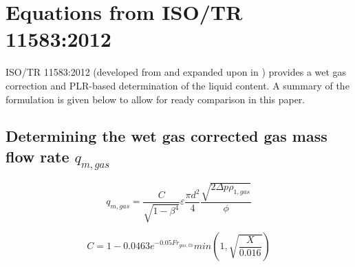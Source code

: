 \documentclass[journal]{IEEEtran}
\begin{document}
\vfill\eject

%
\appendices
\section{Equations from ISO/TR 11583:2012} \label{11583 Equations}

ISO/TR 11583:2012\cite{2012ISO/TRConduits} (developed from \cite{Reader-Harris2009} and expanded upon in \cite{Reader-Harris2015}) provides a wet gas correction and \acrshort{PLR}-based determination of the liquid content.  A summary of the formulation is given below to allow for ready comparison in this paper.

\subsection{Determining the wet gas corrected gas mass flow rate $q_{m,gas}$}

\begin{equation}
    q_{m,gas} = \frac{C}{\sqrt{1-\beta^{4}}}\varepsilon\frac{\pi d^{2}}{4}\frac{\sqrt{2\Delta p \rho_{1,gas}}}{\phi}
\end{equation}

\begin{equation}
    C = 1 - 0.0463 e^{-0.05 Fr_{gas,th}} min \left( 1, \sqrt{\frac{X}{0.016}} \right )
\end{equation}
\end{document}
